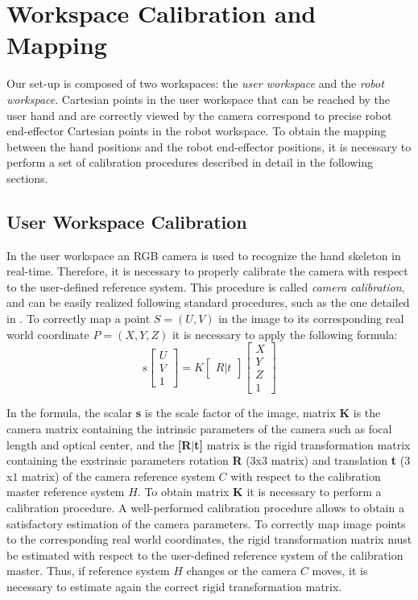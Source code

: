 \documentclass[letterpaper, 10 pt, conference]{ieeeconf}  %
\begin{document}
\section{Workspace Calibration and Mapping} \label{sec:calib}
Our set-up is composed of two workspaces: the \textit{user workspace} and the \textit{robot workspace}. Cartesian points in the user workspace that can be reached by the user hand and are correctly viewed by the camera correspond to precise robot end-effector Cartesian points in the robot workspace. To obtain the mapping between the hand positions and the robot end-effector positions, it is necessary to perform a set of calibration procedures described in detail in the following sections.

\subsection{User Workspace Calibration}
In the user workspace an RGB camera is used to recognize the hand skeleton in real-time. Therefore, it is necessary to properly calibrate the camera with respect to the user-defined reference system. This procedure is called \textit{camera calibration}, and can be easily realized following standard procedures, such as the one detailed in \cite{MatlabCameraCalib}.
To correctly map a point $S = (U, V)$ in the image to its corresponding real world coordinate $P = (X, Y, Z)$ it is necessary to apply the following formula:
\begin{equation}
s 
  \begin{bmatrix}
    U \\
    V \\
    1
  \end{bmatrix}
 =
K
  \begin{bmatrix}
    R | t
  \end{bmatrix}
  \begin{bmatrix}
    X \\
    Y \\
    Z \\
    1
  \end{bmatrix}
\label{eq1}
\end{equation}

In the formula, the scalar \textbf{s} is the scale factor of the image, matrix \textbf{K} is the camera matrix containing the intrinsic parameters of the camera such as focal length and optical center, and the \textbf{[R$|$t]} matrix is the rigid transformation matrix containing the exstrinsic parameters rotation \textbf{R} ($3$x$3$ matrix) and translation \textbf{t} ($3$x$1$ matrix) of the camera reference system $C$ with respect to the calibration master reference system $H$.
To obtain matrix \textbf{K} it is necessary to perform a calibration procedure. A well-performed calibration procedure allows to obtain a satisfactory estimation of the camera parameters. To correctly map image points to the corresponding real world coordinates, the rigid transformation matrix must be estimated with respect to the user-defined reference system of the calibration master. Thus, if reference system $H$ changes or the camera $C$ moves, it is necessary to estimate again the correct rigid transformation matrix. %
\end{document}
